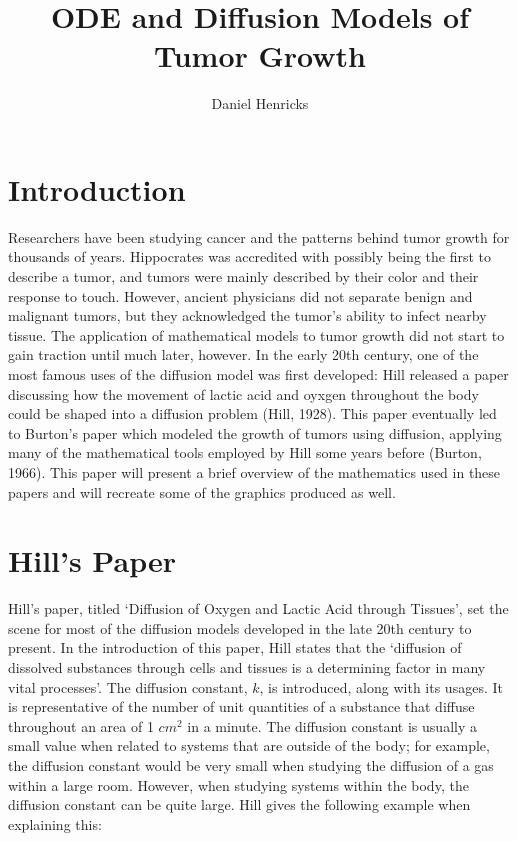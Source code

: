 \documentclass{article}
\title{ODE and Diffusion Models of Tumor Growth}
\author{Daniel Henricks}
\begin{document}
\maketitle

\section{Introduction}

Researchers have been studying cancer and the patterns behind tumor growth for thousands of years. Hippocrates
was accredited with possibly being the first to describe a tumor, and tumors were mainly described by their color
and their response to touch. However, ancient physicians did not separate benign and malignant tumors, but they
acknowledged the tumor's ability to infect nearby tissue. The application of mathematical models to tumor growth
did not start to gain traction until much later, however. In the early 20th century, one of the most famous uses of
the diffusion model was first developed: Hill released a paper discussing how the movement of lactic acid
and oyxgen throughout the body could be shaped into a diffusion problem (Hill, 1928). This paper eventually led to
Burton's paper which modeled the growth of tumors using diffusion, applying many of the mathematical tools employed
by Hill some years before (Burton, 1966). This paper will present a brief overview of the mathematics used in these
papers and will recreate some of the graphics produced as well.

\section{Hill's Paper}

Hill's paper, titled `Diffusion of Oxygen and Lactic Acid through Tissues', set the scene for most of the diffusion models
developed in the late 20th century to present. In the introduction of this paper, Hill states that the 
`diffusion of dissolved substances through cells and tissues is a determining factor in many vital processes'. 
The diffusion constant, $k$, is introduced, along with its usages. It is representative of the number of unit quantities
of a substance that diffuse throughout an area of 1 $cm^2$ in a minute. The diffusion constant is usually a small value
when related to systems that are outside of the body; for example, the diffusion constant would be very small when studying
the diffusion of a gas within a large room. However, when studying systems within the body, the diffusion constant can be quite large.
Hill gives the following example when explaining this:
\end{document}
